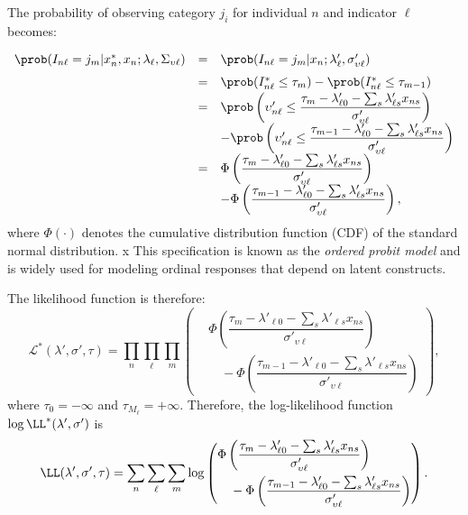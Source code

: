 \documentclass[12pt,a4paper]{article}
\begin{document}
The
probability of observing category $j_i$ for individual $n$ and indicator $\ell$ becomes:
\[
\renewcommand{\arraystretch}{1.5}
\begin{array}{rcl}
\prob(I_{n\ell} = j_m| x^*_n, x_n ; \lambda_\ell, \Sigma_{\upsilon \ell}) &=&\prob(I_{n\ell} = j_m| x_n ; \lambda'_\ell, \sigma'_{\upsilon \ell}) \\&=& \prob(I^*_{n\ell} \leq \tau_m) - \prob(I^*_{n\ell} \leq \tau_{m-1}) \\
&=& \prob\left( \upsilon'_{n\ell} \leq \dfrac{\tau_m -\lambda'_{\ell 0} - \sum_s \lambda'_{\ell s} x_{ns}}{\sigma'_{\upsilon \ell}} \right) \\
& &- \prob\left( \upsilon'_{n\ell} \leq \dfrac{\tau_{m-1} -\lambda'_{\ell 0} - \sum_s \lambda'_{\ell s} x_{ns}}{\sigma'_{\upsilon \ell}} \right) \\
&=& \Phi\left(\dfrac{\tau_m -\lambda'_{\ell 0} - \sum_s \lambda'_{\ell s} x_{ns}}{\sigma'_{\upsilon \ell}} \right) \\
& &- \Phi\left( \dfrac{\tau_{m-1} -\lambda'_{\ell 0} - \sum_s \lambda'_{\ell s} x_{ns}}{\sigma'_{\upsilon \ell}} \right), \\
\end{array}
\]
where $\Phi(\cdot)$ denotes the cumulative distribution function (CDF) of the standard normal distribution.
x
This specification is known as the \emph{ordered probit model} and is
widely used for modeling ordinal responses that depend on latent
constructs.

The likelihood function is therefore:
\[
\mathcal{L}^*(\lambda', \sigma', \tau) = 
\prod_n \prod_\ell \prod_m 
\left(
\begin{aligned}
&\Phi\left(
\dfrac{
\tau_m - \lambda'_{\ell 0} - \sum_s \lambda'_{\ell s} x_{ns}
}{
\sigma'_{\upsilon \ell}
}
\right) \\
&\quad - \Phi\left(
\dfrac{
\tau_{m-1} - \lambda'_{\ell 0} - \sum_s \lambda'_{\ell s} x_{ns}
}{
\sigma'_{\upsilon \ell}
}
\right)
\end{aligned}
\right),
\]
where $\tau_0=-\infty$ and $\tau_{M_\ell}=+\infty$. Therefore, the log-likelihood function $\log \LL^*(\lambda', \sigma')$ is 
\[
\LL(\lambda', \sigma', \tau) = 
\sum_n \sum_\ell \sum_m \log 
\left(
\begin{aligned}
&\Phi\left(
\dfrac{
\tau_m - \lambda'_{\ell 0} - \sum_s \lambda'_{\ell s} x_{ns}
}{
\sigma'_{\upsilon \ell}
}
\right) \\
&\quad - \Phi\left(
\dfrac{
\tau_{m-1} - \lambda'_{\ell 0} - \sum_s \lambda'_{\ell s} x_{ns}
}{
\sigma'_{\upsilon \ell}
}
\right)
\end{aligned}
\right).
\]
\end{document}
